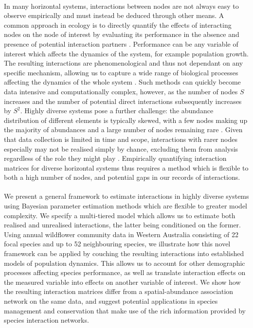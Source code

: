 \documentclass[a4,12pt]{article}
\begin{document}
    \paragraph{} 
    In many horizontal systems, interactions between nodes are not always easy to observe empirically and must instead be deduced through other means. A common approach in ecology is to directly quantify the effects of interacting nodes on the node of interest by evaluating its performance in the absence and presence of potential interaction partners \parencite{Connell1961, Grace1990}. Performance can be any variable of interest which affects the dynamics of the system, for example population growth. The resulting interactions are phenomenological and thus not dependant on any specific mechanism, allowing us to capture a wide range of biological processes affecting the dynamics of the whole system \parencite{Novak2010}. Such methods can quickly become data intensive and computationally complex, however, as the number of nodes $S$ increases and the number of potential direct interactions subsequently increases by $S^2$. Highly diverse systems pose a further challenge: the abundance distribution of different elements is typically skewed, with a few nodes making up the majority of abundances and a large number of nodes remaining rare \parencite{Fisher1943}. Given that data collection is limited in time and scope, interactions with rarer nodes especially may not be realised simply by chance, excluding them from analysis regardless of the role they might play \parencite{Olesen2011}. Empirically quantifying interaction matrices for diverse horizontal systems thus requires a method which is flexible to both a high number of nodes, and potential gaps in our records of interactions. 


    \paragraph{} 
    We present a general framework to estimate interactions in highly diverse systems using Bayesian parameter estimation methods which are flexible to greater model complexity. We specify a multi-tiered model which allows us to estimate both realised and unrealised interactions, the latter being conditioned on the former. Using annual wildflower community data in Western Australia consisting of 22 focal species and up to 52 neighbouring species, we illustrate how this novel framework can be applied by couching the resulting interactions into established models of population dynamics. This allows us to account for other demographic processes affecting species performance, as well as translate interaction effects on the measured variable into effects on another variable of interest. We show how the resulting interaction matrices differ from a spatial-abundance association network on the same data, and suggest potential applications in species management and conservation that make use of the rich information provided by species interaction networks.
\end{document}
